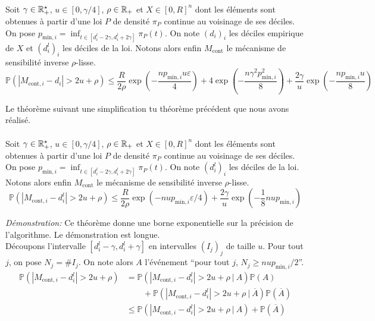\\
Soit \(\gamma \in \mathbb{R}_+^\star\), \(u \in [0, \gamma/4]\), \(\rho \in \mathbb{R}_+\) et \(X \in [0,R]^n\) dont les éléments sont obtenues à partir d'une loi \(P\) de densité \(\pi_P\) continue au voisinage de ses déciles. On pose \(p_{\text{min}, i} = \inf_{t \in [d_i^l - 2\gamma, d_i^l + 2\gamma]} \pi_P(t)\). On note \((d_i)_i\) les déciles empirique de \(X\) et \((d_i^l)_i\) les déciles de la loi. Notons alors enfin \(M_{\text{cont}}\) le mécanisme de sensibilité inverse \(\rho\)-lisse.
\[
    \mathbb P\left( |M_{\text{cont}, i} - d_i| > 2u + \rho\right) \leq \dfrac{R}{2\rho}\exp\left(- \dfrac{np_{\text{min}, i}u\varepsilon}{4} \right) + 4\exp\left(- \dfrac{n\gamma^2p_{\text{min},i}^2}{8} \right) + \dfrac{2\gamma}{u}\exp\left( -\dfrac{np_{\text{min},i}u}{8} \right)
\]

Le théorème suivant une simplification tu théorème précédent que nous avons réalisé.\\

\label{EDE}\\
Soit \(\gamma \in \mathbb{R}_+^\star\), \(u \in [0, \gamma/4]\), \(\rho \in \mathbb{R}_+\) et \(X \in [0,R]^n\) dont les éléments sont obtenues à partir d'une loi \(P\) de densité \(\pi_P\) continue au voisinage de ses déciles. On pose \(p_{\text{min}, i} = \inf_{t \in [d_i^l - 2\gamma, d_i^l + 2\gamma]} \pi_P(t)\). On note \((d_i^l)_i\) les déciles de la loi. Notons alors enfin \(M_{\text{cont}}\) le mécanisme de sensibilité inverse \(\rho\)-lisse.
\[
    \mathbb P\left( |M_{\text{cont}, i} - d_i^l| > 2u + \rho \right) \leq  \dfrac{R}{2\rho}\exp\left( -{nup_{\text{min}, i}\varepsilon}/{4} \right) + \dfrac{2\gamma}{u}\exp\left( - \dfrac{1}{8}n u p_{\text{min}, i} \right) 
\]


\textit{Démonstration:} Ce théorème donne une borne exponentielle sur la précision de l'algorithme. Le démonstration est longue.\\

Découpons l'intervalle \([d_i^l - \gamma, d_i^l + \gamma]\) en intervalles \((I_j)_j\) de taille \(u\). Pour tout \(j\), on pose \(N_j = \#I_j\). On note alors \(A\) l'événement ``pour tout \(j\), \(N_j \geq nup_{\text{min}, i}/2\)''.\\
\begin{align*}
    \mathbb P\left( |M_{\text{cont}, i} - d_i^l| > 2u + \rho \right) & = \mathbb P\left( |M_{\text{cont}, i} - d_i^l| > 2u + \rho \ | \ A \right)\mathbb P\left( A \right)\\
    & \quad \quad  + \mathbb P\left( |M_{\text{cont}, i} - d_i^l| > 2u + \rho \ | \ \overline A \right) \mathbb P \left( \overline A  \right)\\
    & \leq \mathbb P\left( |M_{\text{cont}, i} - d_i^l| > 2u + \rho \ | \ A \right) +  \mathbb P \left( \overline A  \right)\\
\end{align*}

